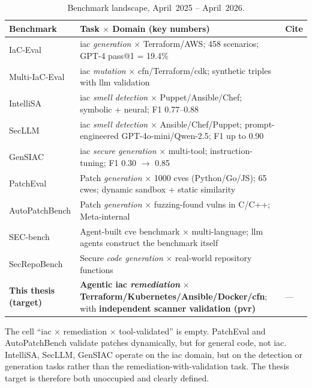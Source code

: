 \documentclass[12pt, a4paper]{report}
\begin{document}
\begin{table}[H]
  \centering
  \caption{Benchmark landscape, April~2025 -- April~2026.}
  \label{tab:landscape}
  \small
  \begin{tabularx}{\linewidth}{l X l}
    \toprule
    \textbf{Benchmark} & \textbf{Task $\times$ Domain (key numbers)} & \textbf{Cite} \\
    \midrule
    IaC-Eval & \gls{iac} \emph{generation} $\times$ Terraform/AWS; 458 scenarios; GPT-4 pass@1 = 19.4\% & \citep{kon2024iaceval} \\
    Multi-IaC-Eval & \gls{iac} \emph{mutation} $\times$ \gls{cfn}/Terraform/\gls{cdk}; synthetic triples with \gls{llm} validation & \citep{multi2025iaceval} \\
    IntelliSA & \gls{iac} \emph{smell detection} $\times$ Puppet/Ansible/Chef; symbolic + neural; F1 0.77--0.88 & \citep{intellisa2026} \\
    SecLLM & \gls{iac} \emph{smell detection} $\times$ Ansible/Chef/Puppet; prompt-engineered GPT-4o-mini/Qwen-2.5; F1 up to 0.90 & \citep{devito2025secllm} \\
    GenSIAC & \gls{iac} \emph{secure generation} $\times$ multi-tool; instruction-tuning; F1 0.30 $\to$ 0.85 & \citep{li2025gensiac} \\
    \midrule
    PatchEval & Patch \emph{generation} $\times$ 1000 \glspl{cve} (Python/Go/JS); 65 \glspl{cwe}; dynamic sandbox + static similarity & \citep{lyu2024patcheval} \\
    AutoPatchBench & Patch \emph{generation} $\times$ fuzzing-found vulns in C/C++; Meta-internal & \citep{autopatchbench2025} \\
    SEC-bench & Agent-built \gls{cve} benchmark $\times$ multi-language; \gls{llm} agents construct the benchmark itself & \citep{secbench2025} \\
    SecRepoBench & Secure \emph{code generation} $\times$ real-world repository functions & \citep{secrepobench2025} \\
    \midrule
    \rowcolor{yellow!12}
    \textbf{This thesis (target)} &
    \textbf{Agentic \gls{iac} \emph{remediation}} $\times$
    \textbf{Terraform/Kubernetes/Ansible/Docker/\gls{cfn}}; with
    \textbf{independent scanner validation (\gls{pvr})} &
    --- \\
    \bottomrule
  \end{tabularx}
\end{table}

\begin{findingbox}
The cell ``\gls{iac} $\times$ remediation $\times$ tool-validated'' is empty.
PatchEval and AutoPatchBench validate patches dynamically, but for general
code, not \gls{iac}. IntelliSA, SecLLM, GenSIAC operate on the \gls{iac}
domain, but on the detection or generation tasks rather than the
remediation-with-validation task. The thesis target is therefore both
unoccupied and clearly defined.
\end{findingbox}
\end{document}
